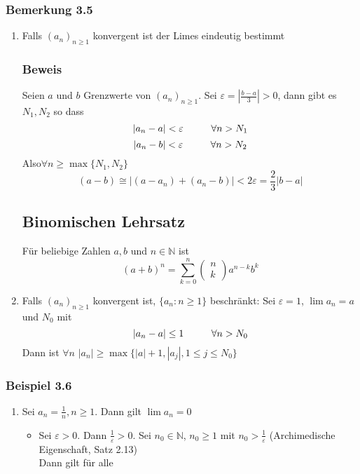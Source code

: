 \subsubsection*{Bemerkung 3.5}
\begin{enumerate}
\item Falls $(a_n)_{n\geq 1}$ konvergent ist der Limes eindeutig bestimmt
\subsubsection*{Beweis}
Seien $a$ und $b$ Grenzwerte von $(a_n)_{n\geq 1}$. Sei $\varepsilon = \left| \frac{b-a}{3}\right|>0$, dann gibt es $N_1,N_2$ so dass $$\left| a_n-a\right| <\varepsilon\hspace{10mm}\forall n>N_1$$$$\left| a_n-b\right| <\varepsilon\hspace{10mm}\forall n>N_2$$
Also$ \forall n\geq \max\{ N_1,N_2\}$ $$(a-b)\cong\left| (a-a_n)+(a_n-b)\right| < 2\varepsilon=\frac{2}{3}\left|b-a\right|$$
\subsection*{Binomischen Lehrsatz}
Für beliebige Zahlen $a,b$ und $n\in\mathbb{N}$ ist \[{\left( {a + b} \right)^n} = \sum\limits_{k = 0}^n {\left( {\begin{array}{*{20}{c}}
n\\
k
\end{array}} \right){a^{n - k}}{b^k}} \]
\item Falls $(a_n)_{n\geq 1}$ konvergent ist, $\{a_n:n\geq 1\}$ beschränkt: Sei $\varepsilon=1$, $\lim a_n=a$ und $N_0$ mit $$\left| a_n-a\right| \leq 1\hspace{10mm} \forall n>N_0$$ Dann ist $\forall n$ $\left| a_n\right| \geq \max\{\left| a\right| +1,\left| a_j\right|, 1\leq j\leq N_0  \}$
\end{enumerate}
\subsubsection*{Beispiel 3.6}
\begin{enumerate}
\item Sei $a_n=\frac{1}{n}, n\geq 1$. Dann gilt $\lim a_n=0$ 
\begin{itemize}
\item Sei $\varepsilon>0$. Dann $\frac{1}{\varepsilon}>0$. Sei $n_0\in\mathbb{N}$, $n_0\geq 1$ mit $n_0>\frac{1}{\varepsilon}$ (Archimedische Eigenschaft, Satz 2.13)\\
Dann gilt für alle 
\end{itemize}
\end{enumerate}















